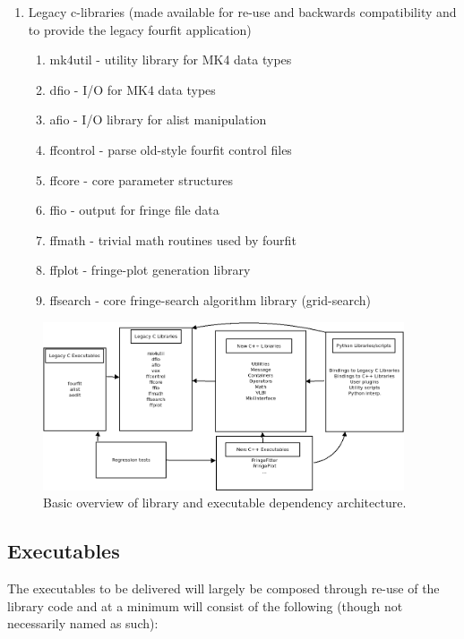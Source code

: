\documentclass[hidelinks]{article}
\let\Oldsubsection\subsection
\renewcommand{\subsection}{\FloatBarrier\Oldsubsection}
\begin{document}
\begin{enumerate}
 \item  Legacy c-libraries (made available for re-use and backwards compatibility and to provide the legacy fourfit application)
  \begin{enumerate}
    \item mk4util - utility library for MK4 data types
    \item dfio - I/O for MK4 data types
    \item afio - I/O library for alist manipulation
    \item ffcontrol - parse old-style fourfit control files 
    \item ffcore - core parameter structures
    \item ffio - output for fringe file data
    \item ffmath - trivial math routines used by fourfit
    \item ffplot - fringe-plot generation library 
    \item ffsearch - core fringe-search algorithm library (grid-search)
 \end{enumerate}
\end{enumerate}


\begin{figure}[h!]
\begin{center}
  \includegraphics[width=0.95\textwidth]{./arch_overview.png}
    \caption{Basic overview of library and executable dependency architecture.}
    \label{fig:lib-arch}
\end{center}
\end{figure}


\subsection{Executables}

The executables to be delivered will largely be composed through re-use of the library code and at a minimum will consist of the following (though not necessarily
named as such):
\end{document}
